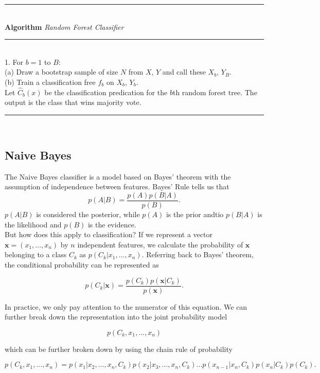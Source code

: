 \documentclass[11pt, letterpaper]{article}
\renewcommand{\vec}[1]{\mathbf{#1}}
\begin{document}
\noindent\rule{13cm}{1.9pt} \\
 \textbf{Algorithm} \textit{Random Forest Classifier}  \\
 \noindent\rule{13cm}{0.8pt} \\
1. For $b=1$ to $B$: \\
\hspace*{10mm} (a) Draw a bootstrap sample of size $N$ from $X$, $Y$ and call these $X_b$, \hspace*{18mm}$Y_B$. \\
\hspace*{10mm} (b) Train a classification free $f_b$ on $X_b$, $Y_b$. \\

Let $\hat{C}_{b}(x) $ be the classification predication for the $b$th random forest tree. The output is the class that wins majority vote. \\
\noindent\rule{13cm}{1.9pt} \\  

\subsection{Naive Bayes}

The Naive Bayes classifier is a model based on Bayes' theorem with the assumption of independence between features. Bayes' Rule tells us that
$$p(A | B) = \frac{p(A)p(B | A) }{p(B)}.$$
$p(A|B)$ is considered the posterior, while $p(A)$ is the prior andtio $p(B | A)$ is the likelihood and $p(B)$ is the evidence. \\

But how does this apply to classification? If we represent a vector $\vec{x} = (x_1,...,x_n)$ by $n$ independent features, we calculate the probability of $\vec{x}$ belonging to a class $C_k$ as $p(C_k | x_1,...,x_n)$. Referring back to Bayes' theorem, the conditional probability can be represented as

$$p(C_k | \vec{x}) = \frac{p(C_k)p(\vec{x} | C_k)}{p(\vec{x})}.$$

In practice, we only pay attention to the numerator of this equation. We can further break down the representation into the joint probability model

$$p(C_k, x_1,...,x_n)$$

which can be further broken down by using the chain rule of probability


$$p(C_k, x_1,..., x_n) = p(x_1 | x_2,...,x_n, C_k)p(x_2 | x_3,...,x_n, C_k)...p(x_{n-1} | x_n, C_k)p(x_n | C_k)p(C_k).$$ 
\end{document}
